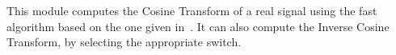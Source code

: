 This module computes the Cosine Transform of a real signal using the 
fast algorithm based on the one given in~\cite{press.flannery.ea:numerical}.
It can also compute the Inverse Cosine Transform, by selecting the appropriate
switch.

